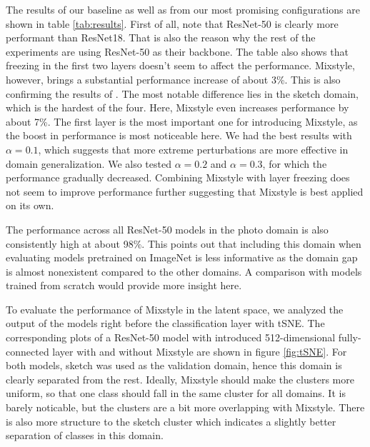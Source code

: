 The results of our baseline as well as from our most promising configurations are shown in table \ref{tab:results}. First of all, note that ResNet-50 is clearly more performant than ResNet18. That is also the reason why the rest of the experiments are using ResNet-50 as their backbone. The table also shows that freezing in the first two layers doesn't seem to affect the performance. Mixstyle, however, brings a substantial performance increase of about 3\%. This is also confirming the results of \cite{zhouMixStyleNeuralNetworks2023}. The most notable difference lies in the sketch domain, which is the hardest of the four. Here, Mixstyle even increases performance by about 7\%. The first layer is the most important one for introducing Mixstyle, as the boost in performance is most noticeable here. We had the best results with $\alpha = 0.1$, which suggests that more extreme perturbations are more effective in domain generalization. We also tested $\alpha = 0.2$ and $\alpha = 0.3$, for which the performance gradually decreased. Combining Mixstyle with layer freezing does not seem to improve performance further suggesting that Mixstyle is best applied on its own.

The performance across all ResNet-50 models in the photo domain is also consistently high at about 98\%. This points out that including this domain when evaluating models pretrained on ImageNet is less informative as the domain gap is almost nonexistent compared to the other domains. A comparison with models trained from scratch would provide more insight here.

To evaluate the performance of Mixstyle in the latent space, we analyzed the output of the models right before the classification layer with tSNE. The corresponding plots of a ResNet-50 model with introduced 512-dimensional fully-connected layer with and without Mixstyle are shown in figure \ref{fig:tSNE}. For both models, sketch was used as the validation domain, hence this domain is clearly separated from the rest. Ideally, Mixstyle should make the clusters more uniform, so that one class should fall in the same cluster for all domains. It is barely noticable, but the clusters are a bit more overlapping with Mixstyle. There is also more structure to the sketch cluster which indicates a slightly better separation of classes in this domain.

